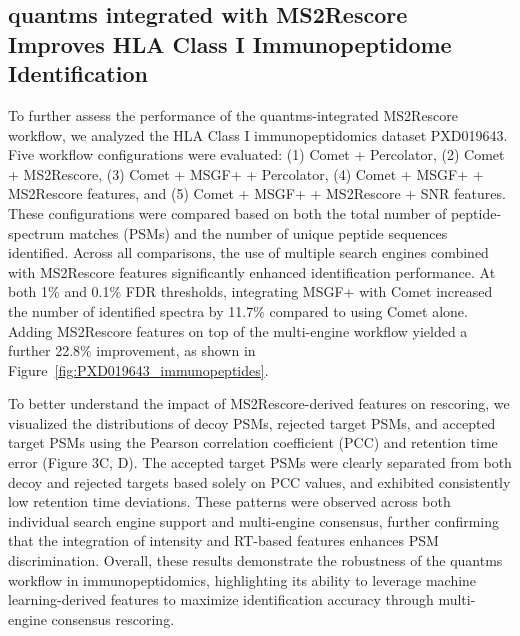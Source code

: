 \documentclass[12pt]{article}
\begin{document}
\subsection{quantms integrated with MS2Rescore Improves HLA Class I Immunopeptidome Identification}
To further assess the performance of the quantms-integrated MS2Rescore workflow, we analyzed the HLA Class I immunopeptidomics dataset PXD019643. Five workflow configurations were evaluated: (1) Comet + Percolator, (2) Comet + MS2Rescore, (3) Comet + MSGF+ + Percolator, (4) Comet + MSGF+ + MS2Rescore features, and (5) Comet + MSGF+ + MS2Rescore + SNR features. These configurations were compared based on both the total number of peptide-spectrum matches (PSMs) and the number of unique peptide sequences identified. Across all comparisons, the use of multiple search engines combined with MS2Rescore features significantly enhanced identification performance. At both 1\% and 0.1\% FDR thresholds, integrating MSGF+ with Comet increased the number of identified spectra by 11.7\% compared to using Comet alone. Adding MS2Rescore features on top of the multi-engine workflow yielded a further 22.8\% improvement, as shown in Figure~\ref{fig:PXD019643_immunopeptides}.

To better understand the impact of MS2Rescore-derived features on rescoring, we visualized the distributions of decoy PSMs, rejected target PSMs, and accepted target PSMs using the Pearson correlation coefficient (PCC) and retention time error (Figure 3C, D). The accepted target PSMs were clearly separated from both decoy and rejected targets based solely on PCC values, and exhibited consistently low retention time deviations. These patterns were observed across both individual search engine support and multi-engine consensus, further confirming that the integration of intensity and RT-based features enhances PSM discrimination. Overall, these results demonstrate the robustness of the quantms workflow in immunopeptidomics, highlighting its ability to leverage machine learning-derived features to maximize identification accuracy through multi-engine consensus rescoring.
\end{document}
